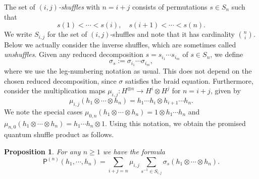 \documentclass[a4paper, 12pt, reqno, english]{amsart}
\numberwithin{equation}{section}
\numberwithin{figure}{section}
\theoremstyle{plain}
\theoremstyle{plain}
\theoremstyle{plain}
\newtheorem{proposition}[theorem]{Proposition}
\theoremstyle{plain}
\theoremstyle{plain}
\theoremstyle{definition}
\theoremstyle{definition}
\theoremstyle{definition}
\theoremstyle{remark}
\theoremstyle{definition}
\theoremstyle{definition}
\newcommand{\pmap}{\mathsf{P}}
\begin{document}
The set of \emph{$(i, j)$-shuffles} with $n = i + j$ consists of permutations $s \in S_n$ such that
\[
s(1) < \cdots < s(i), \quad
s(i + 1) < \cdots < s(n).
\]
We write $S_{i, j}$ for the set of $(i, j)$-shuffles and note that it has cardinality $\binom{n}{i}$.
Below we actually consider the inverse shuffles, which are sometimes called \emph{unshuffles}.
Given any reduced decomposition $s = s_{i_1} \cdots s_{i_m}$ of $s \in S_n$, we define
\[
\sigma_s := \sigma_{i_1} \cdots \sigma_{i_m},
\]
where we use the leg-numbering notation as usual.
This does not depend on the chosen reduced decomposition, since $\sigma$ satisfies the braid equation.
Furthermore, consider the multiplication maps $\mu_{i, j} : H^{\otimes n} \to H^i \otimes H^j$ for $n = i + j$, given by
\[
\mu_{i, j} (h_1 \otimes \cdots \otimes h_n) = h_1 \cdots h_i \otimes h_{i + 1} \cdots h_n.
\]
We note the special cases $\mu_{0, n} (h_1 \otimes \cdots \otimes h_n) = 1 \otimes h_1 \cdots h_n$ and $\mu_{n, 0} (h_1 \otimes \cdots \otimes h_n) = h_1 \cdots h_n \otimes 1$.
Using this notation, we obtain the promised quantum shuffle product as follows.

\begin{proposition}
\label{prop:shuffle-product}
For any $n \geq 1$ we have the formula
\[
\pmap^{(n)} (h_1, \cdots, h_n) = \sum_{i + j = n} \mu_{i, j} \sum_{s^{-1} \in S_{i, j}} \sigma_s (h_1 \otimes \cdots \otimes h_n).
\]
\end{proposition}
\end{document}
